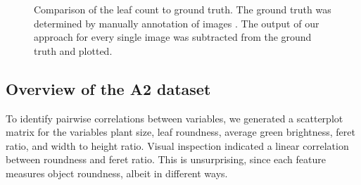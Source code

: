\documentclass[paper=A4,bibliography=totocnumbered]{scrartcl}
\begin{document}
\begin{figure}[h!]
	\qquad
	\caption{Comparison of the leaf count to ground truth. The ground truth was determined by manually annotation of images \citep{Scharr.2014}. The output of our approach for every single image was subtracted from the ground truth and plotted.}
	\label{fig:truth}
\end{figure}


\subsection{Overview of the A2 dataset}

To identify pairwise correlations between variables, we generated a scatterplot matrix for the variables plant size, leaf roundness, average green brightness, feret ratio, and width to height ratio. Visual inspection indicated a linear correlation between roundness and feret ratio. This is unsurprising, since each feature measures object roundness, albeit in different ways. 
\end{document}
